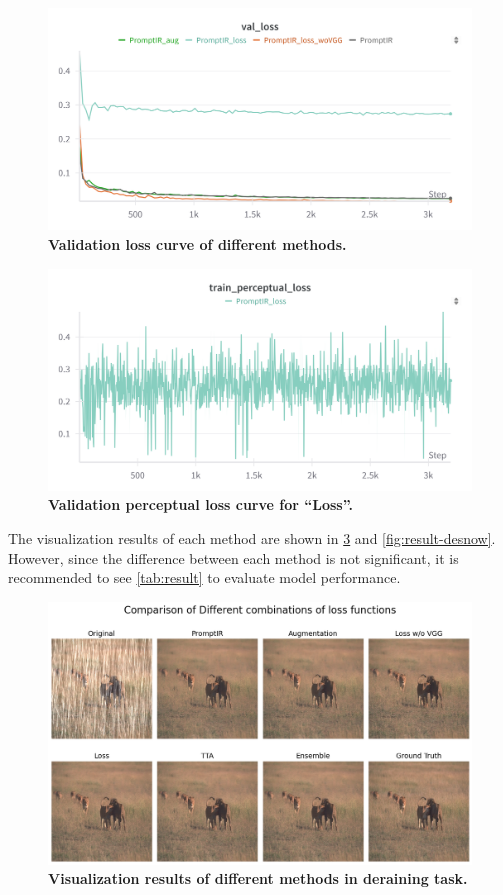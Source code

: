 \documentclass[10pt,twocolumn,letterpaper]{article}
\begin{document}
\begin{figure}[h]
  \centering
  \includegraphics[width=0.95\linewidth]{assets/val_loss.png}
  \caption{\textbf{Validation loss curve of different methods.}}
  \label{fig:val-loss}
\end{figure}

\begin{figure}[h]
  \centering
  \includegraphics[width=0.95\linewidth]{assets/train_perceptual.png}
  \caption{\textbf{Validation perceptual loss curve for ``Loss''.}}
  \label{fig:val-perceptual}
\end{figure}

The visualization results of each method are shown in \cref{fig:result-derain}
and \cref{fig:result-desnow}. However, since the difference between each method
is not significant, it is recommended to see \cref{tab:result} to evaluate model
performance.

\begin{figure}[h]
  \centering
  \includegraphics[width=0.95\linewidth]{assets/result-derain.png}
  \caption{\textbf{Visualization results of different methods in deraining task.}}
  \label{fig:result-derain}
\end{figure}
\end{document}
